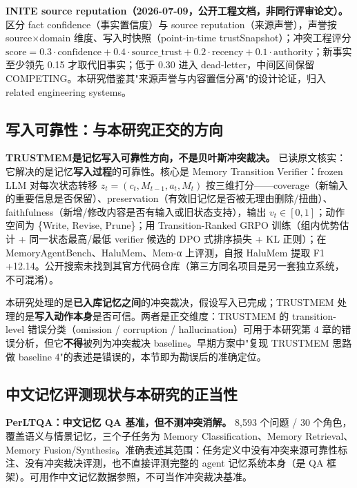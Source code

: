 \documentclass{article}
\begin{document}
\textbf{INITE source reputation（2026-07-09，公开工程文档，非同行评审论文）。}\citep{inite} 区分 fact confidence（事实置信度）与 source reputation（来源声誉），声誉按 source$\times$domain 维度、写入时快照（point-in-time trustSnapshot）；冲突工程评分 $\mathrm{score}=0.3\cdot\mathrm{confidence}+0.4\cdot\mathrm{source\_trust}+0.2\cdot\mathrm{recency}+0.1\cdot\mathrm{authority}$；新事实至少领先 0.15 才取代旧事实；低于 0.30 进入 dead-letter，中间区间保留 COMPETING。本研究借鉴其"来源声誉与内容置信分离"的设计论证，归入 related engineering systems。


\subsection{写入可靠性：与本研究正交的方向}

\textbf{TRUSTMEM\citep{yang2026}是记忆写入可靠性方向，不是贝叶斯冲突裁决。} 已读原文核实：它解决的是记忆\textbf{写入过程}的可靠性。核心是 Memory Transition Verifier：frozen LLM 对每次状态转移 $z_t=(c_t, M_{t-1}, a_t, M_t)$ 按三维打分——coverage（新输入的重要信息是否保留）、preservation（有效旧记忆是否被无理由删除/扭曲）、faithfulness（新增/修改内容是否有输入或旧状态支持），输出 $v_t \in [0,1]$；动作空间为 \{Write, Revise, Prune\}；用 Transition-Ranked GRPO 训练（组内优势估计 + 同一状态最高/最低 verifier 候选的 DPO 式排序损失 + KL 正则）；在 MemoryAgentBench、HaluMem、Mem-α 上评测，自报 HaluMem 提取 F1 +12.14。公开搜索未找到其官方代码仓库（第三方同名项目是另一套独立系统，不可混淆）。


本研究处理的是\textbf{已入库记忆之间}的冲突裁决，假设写入已完成；TRUSTMEM 处理的是\textbf{写入动作本身}是否可信。两者是正交维度：TRUSTMEM 的 transition-level 错误分类（omission / corruption / hallucination）可用于本研究第 4 章的错误分析，但它\textbf{不得}被列为冲突裁决 baseline。早期方案中"复现 TRUSTMEM 思路做 baseline 4"的表述是错误的，本节即为勘误后的准确定位。


\subsection{中文记忆评测现状与本研究的正当性}

\textbf{PerLTQA\citep{du2024}：中文记忆 QA 基准，但不测冲突消解。} 8,593 个问题 / 30 个角色，覆盖语义与情景记忆，三个子任务为 Memory Classification、Memory Retrieval、Memory Fusion/Synthesis。准确表述其范围：任务定义中没有冲突来源可靠性标注、没有冲突裁决评测，也不直接评测完整的 agent 记忆系统本身（是 QA 框架）。可用作中文记忆数据参照，不可当作冲突裁决基准。
\end{document}
